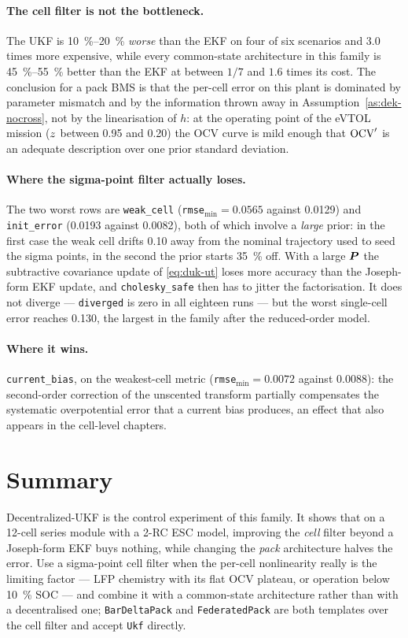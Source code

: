 \paragraph{The cell filter is not the bottleneck.} The UKF is \SIrange{10}{20}{\percent}
\emph{worse} than the EKF on four of six scenarios and \num{3.0} times more expensive, while
every common-state architecture in this family is \SIrange{45}{55}{\percent} better than the EKF
at between $1/7$ and $1.6$ times its cost. The conclusion for a pack BMS is that the per-cell
error on this plant is dominated by parameter mismatch and by the information thrown away in
Assumption~\ref{as:dek-nocross}, not by the linearisation of $h$: at the operating point of the
eVTOL mission ($z$ between \num{0.95} and \num{0.20}) the OCV curve is mild enough that
$\mathrm{OCV}'$ is an adequate description over one prior standard deviation.

\paragraph{Where the sigma-point filter actually loses.} The two worst rows are
\texttt{weak\_cell} (\texttt{rmse}$_{\min}=\num{0.0565}$ against \num{0.0129}) and
\texttt{init\_error} (\num{0.0193} against \num{0.0082}), both of which involve a \emph{large}
prior: in the first case the weak cell drifts \num{0.10} away from the nominal trajectory used to
seed the sigma points, in the second the prior starts \SI{35}{\percent} off. With a large
$\bm{P}$ the subtractive covariance update of \eqref{eq:duk-ut} loses more accuracy than the
Joseph-form EKF update, and \texttt{cholesky\_safe} then has to jitter the factorisation. It does
not diverge --- \texttt{diverged} is zero in all eighteen runs --- but the worst single-cell
error reaches \num{0.130}, the largest in the family after the reduced-order model.

\paragraph{Where it wins.} \texttt{current\_bias}, on the weakest-cell metric
(\texttt{rmse}$_{\min}=\num{0.0072}$ against \num{0.0088}): the second-order correction of the
unscented transform partially compensates the systematic overpotential error that a current bias
produces, an effect that also appears in the cell-level chapters.

\section{Summary}
Decentralized-UKF is the control experiment of this family. It shows that on a 12-cell series
module with a 2-RC ESC model, improving the \emph{cell} filter beyond a Joseph-form EKF buys
nothing, while changing the \emph{pack} architecture halves the error. Use a sigma-point cell
filter when the per-cell nonlinearity really is the limiting factor --- LFP chemistry with its
flat OCV plateau, or operation below \SI{10}{\percent} SOC --- and combine it with a common-state
architecture rather than with a decentralised one; \texttt{BarDeltaPack} and
\texttt{FederatedPack} are both templates over the cell filter and accept \texttt{Ukf} directly.
